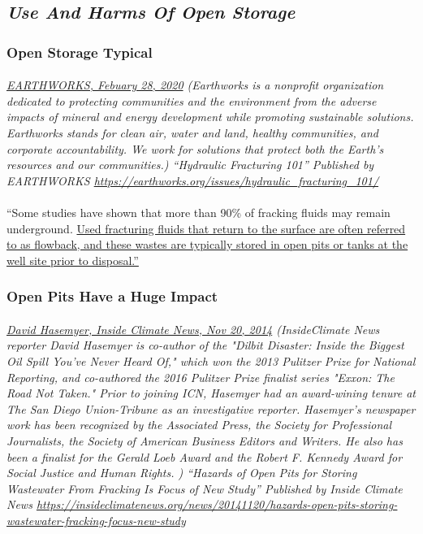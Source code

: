 \documentclass{article}
\begin{document}
\subsection{\emph{Use And Harms Of Open Storage}}

\subsubsection{Open Storage Typical}
\paragraph{}
\small
\textit{
\underline{EARTHWORKS, Febuary 28, 2020}
(Earthworks is a nonprofit organization dedicated to protecting communities and the environment from the adverse impacts of mineral and energy development while promoting sustainable solutions. Earthworks stands for clean air, water and land, healthy communities, and corporate accountability. We work for solutions that protect both the Earth’s resources and our communities.) “Hydraulic Fracturing 101” Published by EARTHWORKS 
\url{https://earthworks.org/issues/hydraulic_fracturing_101/}}
\normalsize

\paragraph{}
``Some studies have shown that more than 90\% of fracking fluids may remain underground. \ul{Used fracturing fluids that return to the surface are often referred to as flowback, and these wastes are typically stored in open pits or tanks at the well site prior to disposal.''}

\subsubsection{Open Pits Have a Huge Impact}
\paragraph{}
\small
\textit{
\underline{David Hasemyer, Inside Climate News, Nov 20, 2014}
  (InsideClimate News reporter David Hasemyer is co-author of the "Dilbit Disaster: Inside the Biggest Oil Spill You've Never Heard Of," which won the 2013 Pulitzer Prize for National Reporting, and co-authored the 2016 Pulitzer Prize finalist series "Exxon: The Road Not Taken." Prior to joining ICN, Hasemyer had an award-wining tenure at The San Diego Union-Tribune as an investigative reporter. Hasemyer's newspaper work has been recognized by the Associated Press, the Society for Professional Journalists, the Society of American Business Editors and Writers. He also has been a finalist for the Gerald Loeb Award and the Robert F. Kennedy Award for Social Justice and Human Rights. ) “Hazards of Open Pits for Storing Wastewater From Fracking Is Focus of New Study” Published by Inside Climate News
\url{https://insideclimatenews.org/news/20141120/hazards-open-pits-storing-wastewater-fracking-focus-new-study }}
\normalsize
\end{document}

